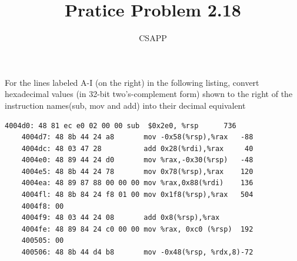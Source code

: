 \documentclass{article}
\title{Pratice Problem 2.18}
\author{CSAPP}
\begin{document}
    \maketitle

    \begin{flushleft}
        For the lines labeled A-I (on the right) in the following
        listing, convert hexadecimal values (in 32-bit two's-complement form)
        shown to the right of the instruction names(sub, mov and add) into their
        decimal equivalent
        
        
        \begin{lstlisting}[language={[x86masm]Assembler}]
    4004d0: 48 81 ec e0 02 00 00 sub  $0x2e0, %rsp      736
    4004d7: 48 8b 44 24 a8       mov -0x58(%rsp),%rax   -88 
    4004dc: 48 03 47 28          add 0x28(%rdi),%rax     40
    4004e0: 48 89 44 24 d0       mov %rax,-0x30(%rsp)   -48
    4004e5: 48 8b 44 24 78       mov 0x78(%rsp),%rax    120
    4004ea: 48 89 87 88 00 00 00 mov %rax,0x88(%rdi)    136
    4004fl: 48 8b 84 24 f8 01 00 mov 0x1f8(%rsp),%rax   504
    4004f8: 00                              
    4004f9: 48 03 44 24 08       add 0x8(%rsp),%rax    
    4004fe: 48 89 84 24 c0 00 00 mov %rax, 0xc0 (%rsp)  192
    400505: 00                                            
    400506: 48 8b 44 d4 b8       mov -0x48(%rsp, %rdx,8)-72




        \end{lstlisting}
    \end{flushleft}
\end{document}
